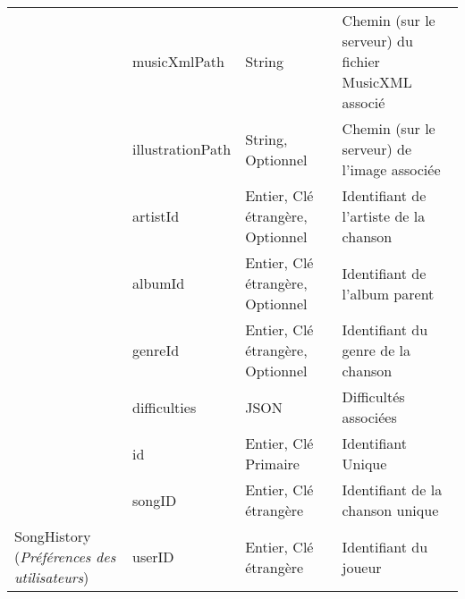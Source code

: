 \begin{longtable}[c]{@{}|p{}|p{}|p{}|p{}|@{}}
														& musicXmlPath                                         & String                                                                                   & Chemin (sur le serveur) du fichier MusicXML associé                                      \\* \cline{2-4} 
														& illustrationPath                                     & String, Optionnel                                                                         & Chemin (sur le serveur) de l’image associée                                              \\* \cline{2-4} 
														& artistId                                             & Entier, Clé étrangère, Optionnel                                                          & Identifiant de l’artiste de la chanson                                                   \\* \cline{2-4} 
														& albumId                                              & Entier, Clé étrangère, Optionnel                                                          & Identifiant de l’album parent                                                            \\* \cline{2-4} 
														& genreId                                              & Entier, Clé étrangère, Optionnel                                                          & Identifiant du genre de la chanson                                                       \\* \cline{2-4} 
							                            & difficulties                                         & JSON                                                                                     & Difficultés associées                                                                    \\* \hline
														& id                                                   & Entier, Clé Primaire                                                                     & Identifiant Unique                                                                       \\* \cline{2-4} 
														& songID                                               & Entier, Clé étrangère                                                                    & Identifiant de la chanson unique                                                         \\* \cline{2-4} 
	\multirow{-3}{0.18\textwidth}{SongHistory (\textit{Préférences des utilisateurs})}						& userID                                               & Entier, Clé étrangère                                                                    & Identifiant du joueur                                                                    \\* \cline{2-4} 

\end{longtable}
